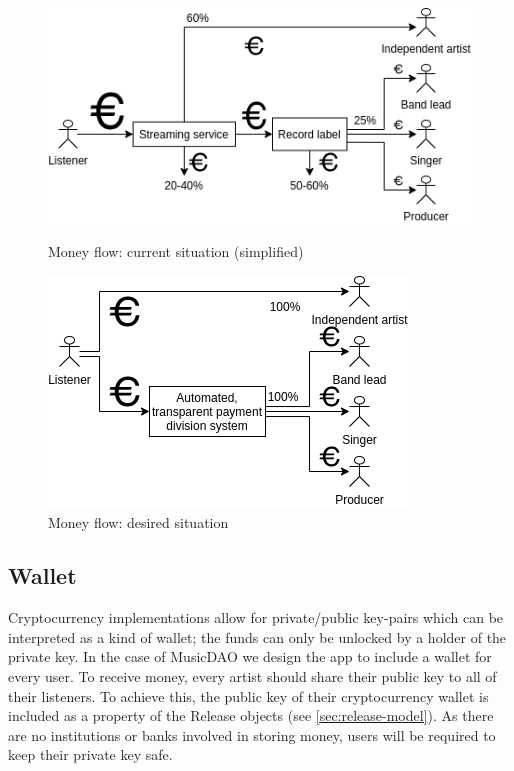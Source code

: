 \begin{figure}
        \includegraphics[width=\linewidth]{design/current-money-flow.png}
        \caption{Money flow: current situation (simplified)}
        \label{fig:current-money-flow}
    \endminipage\hfill
        \includegraphics[width=\linewidth]{design/desired-money-flow.png}
        \caption{Money flow: desired situation}
        \label{fig:desired-money-flow}
    \endminipage
\end{figure}
\subsection{Wallet}
Cryptocurrency implementations allow for private/public key-pairs which can be interpreted as a kind of wallet; the funds can only be unlocked by a holder of the private key. In the case of MusicDAO we design the app to include a wallet for every user. To receive money, every artist should share their public key to all of their listeners. To achieve this, the public key of their cryptocurrency wallet is included as a property of the Release objects (see \ref{sec:release-model}). As there are no institutions or banks involved in storing money, users will be required to keep their private key safe.


